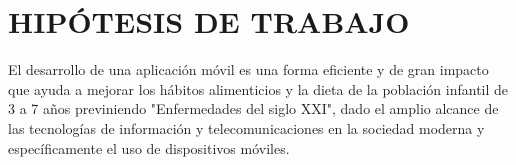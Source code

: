 \section{HIPÓTESIS DE TRABAJO}
El desarrollo de una aplicación móvil es una forma eficiente y de gran impacto que ayuda a mejorar los hábitos alimenticios y la dieta de la población infantil de 3 a 7 años previniendo "Enfermedades del siglo XXI", dado el amplio alcance de las tecnologías de información y telecomunicaciones en la sociedad moderna y específicamente el uso de dispositivos móviles. 


